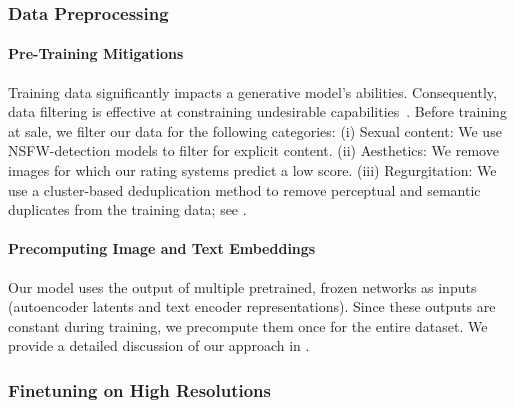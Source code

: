 \subsubsection{Data Preprocessing}
\paragraph{Pre-Training Mitigations}
Training data significantly impacts a generative model's abilities. Consequently, data filtering is effective at constraining undesirable capabilities~\citep{dalle2mitigations}. 
Before training at sale, we filter our data for the following categories:
(i) Sexual content: We use NSFW-detection models to filter for explicit content. 
(ii) Aesthetics: We remove images for which our rating systems predict a low score.
(iii) Regurgitation: We use a cluster-based deduplication method to remove perceptual and semantic duplicates from the training data; see .

\paragraph{Precomputing Image and Text Embeddings}
Our model uses the output of multiple pretrained, frozen networks as inputs (autoencoder latents and text encoder representations). %
Since these outputs are constant during training, we precompute them once for the entire dataset. We provide a detailed discussion of our approach in . 



%
\subsubsection{Finetuning on High Resolutions}
\label{subsec:shifting}
\maxattnlogitqk
